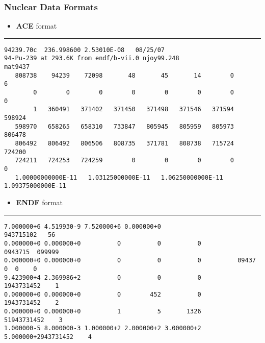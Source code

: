\begin{frame}[fragile]
\frametitle{Nuclear Data Formats}
\begin{itemize}
  \item \textbf{ACE} format 
\end{itemize}
\hrule
\vspace{-0.1in}
{\tiny
\begin{verbatim}
94239.70c  236.998600 2.53010E-08   08/25/07
94-Pu-239 at 293.6K from endf/b-vii.0 njoy99.248                         mat9437
   808738    94239    72098       48       45       14        0        6
        0        0        0        0        0        0        0        0
        1   360491   371402   371450   371498   371546   371594   598924
   598970   658265   658310   733847   805945   805959   805973   806478
   806492   806492   806506   808735   371781   808738   715724   724200
   724211   724253   724259        0        0        0        0        0
   1.00000000000E-11   1.03125000000E-11   1.06250000000E-11   1.09375000000E-11
	\end{verbatim}}
\begin{itemize}
	\vspace{-0.05in}
	\item \textbf{ENDF} format
\end{itemize}
\hrule
\vspace{-0.1in}
{\tiny
	\begin{verbatim}
7.000000+6 4.519930-9 7.520000+6 0.000000+0                      943715102   56
0.000000+0 0.000000+0          0          0          0          0943715  099999
0.000000+0 0.000000+0          0          0          0          09437 0  0    0
9.423900+4 2.369986+2          0          0          0          1943731452    1
0.000000+0 0.000000+0          0        452          0          1943731452    2
0.000000+0 0.000000+0          1          5       1326         51943731452    3
1.000000-5 8.000000-3 1.000000+2 2.000000+2 3.000000+2 5.000000+2943731452    4
\end{verbatim}}


\end{frame} 



